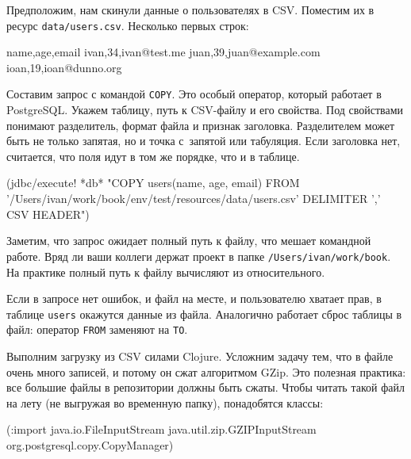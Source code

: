 Предположим, нам скинули данные о пользователях в CSV. Поместим их в ресурс
\verb|data/users.csv|. Несколько первых строк:

\begin{english}
  \begin{text}
name,age,email
ivan,34,ivan@test.me
juan,39,juan@example.com
ioan,19,ioan@dunno.org
  \end{text}
\end{english}


Составим запрос с командой \verb|COPY|. Это особый оператор, который работает в
PostgreSQL. Укажем таблицу, путь к CSV-файлу и его свойства. Под свойствами
понимают разделитель, формат файла и признак заголовка. Разделителем может быть
не только запятая, но и точка с~запятой или табуляция. Если заголовка нет,
считается, что поля идут в том же порядке, что и в таблице.

\begin{english}
  \begin{clojure}
(jdbc/execute! *db*
 "COPY users(name, age, email)
  FROM '/Users/ivan/work/book/env/test/resources/data/users.csv'
  DELIMITER ',' CSV HEADER")
  \end{clojure}
\end{english}

Заметим, что запрос ожидает полный путь к файлу, что мешает командной
работе. Вряд ли ваши коллеги держат проект в папке
\verb|/Users/ivan/work/book|. На практике полный путь к файлу вычисляют из
относительного.

Если в запросе нет ошибок, и файл на месте, и пользователю хватает прав, в
таблице \verb|users| окажутся данные из файла. Аналогично работает сброс
таблицы в файл: оператор \verb|FROM| заменяют на \verb|TO|.


Выполним загрузку из CSV силами Clojure. Усложним задачу тем, что в файле очень
много записей, и потому он сжат алгоритмом GZip. Это полезная практика: все
большие файлы в репозитории должны быть сжаты. Чтобы читать такой файл на лету
(не выгружая во временную папку), понадобятся классы:

\begin{english}
  \begin{clojure}
(:import java.io.FileInputStream
         java.util.zip.GZIPInputStream
         org.postgresql.copy.CopyManager)
  \end{clojure}
\end{english}

